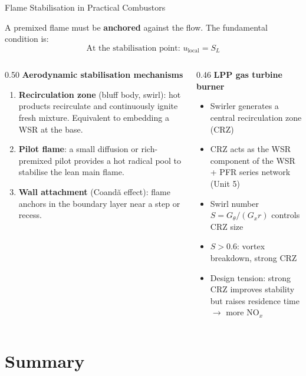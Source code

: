 \documentclass[12pt,aspectratio=169]{beamer}
\newcommand{\SL}{S_L}
\begin{document}
\begin{frame}{Flame Stabilisation in Practical Combustors}

  A premixed flame must be \textbf{anchored} against the flow.
  The fundamental condition is:
  \[
    \text{At the stabilisation point: } u_{\text{local}} = \SL
  \]

  \begin{columns}[t]
    \begin{column}{0.50\textwidth}
      \textbf{Aerodynamic stabilisation mechanisms}
      \begin{enumerate}
        \item \textbf{Recirculation zone} (bluff body, swirl):
              hot products recirculate and continuously ignite
              fresh mixture.
              Equivalent to embedding a WSR at the base.
        \item \textbf{Pilot flame}: a small diffusion or
              rich-premixed pilot provides a hot radical pool
              to stabilise the lean main flame.
        \item \textbf{Wall attachment} (Coand\u{a} effect):
              flame anchors in the boundary layer near a
              step or recess.
      \end{enumerate}
    \end{column}
    \begin{column}{0.46\textwidth}
      \textbf{LPP gas turbine burner}
      \begin{itemize}
        \item Swirler generates a central recirculation zone (CRZ)
        \item CRZ acts as the WSR component of the
              WSR + PFR series network (Unit 5)
        \item Swirl number $S = G_\theta / (G_x r)$ controls
              CRZ size
        \item $S > 0.6$: vortex breakdown, strong CRZ
        \item Design tension: strong CRZ improves stability
              but raises residence time $\to$ more NO$_x$
      \end{itemize}
    \end{column}
  \end{columns}
\end{frame}

\section{Summary}
\end{document}
